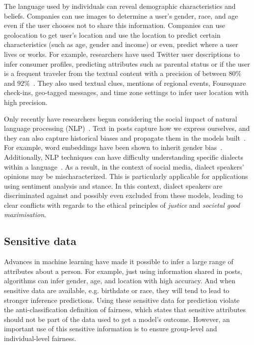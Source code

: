 \documentclass[11pt]{article} %
\begin{document}
The language used by individuals can reveal demographic characteristics and beliefs. Companies can use images to determine a user's  gender, race, and age even if the user chooses not to share this information. Companies can use geolocation to get user's location and use the location to predict certain characteristics (such as age, gender and income) or even, predict where a user lives or works. For example, researchers have used Twitter user descriptions to infer consumer profiles, predicting attributes such as parental status or if the user is a frequent traveler from the textual content with a precision of between $80\%$ and $92\%$~\cite{hernandez2013}. They also used textual clues, mentions of regional events, Foursquare check-ins, geo-tagged messages, and time zone settings to infer user location with high precision. 

Only recently have researchers begun considering the social impact of natural language processing (NLP)~\cite{hovy2016,blodgett2020}. Text in posts capture how we express ourselves, and they can also capture historical biases and propagate them in the models built~\cite{garg2018,caliskan2017}. For example, word embeddings have been shown to inherit gender bias~\cite{sun2019,bolukbasi2016a,gonen2019}. Additionally, NLP techniques can have difficulty understanding specific dialects within a language~\cite{blodgett2016}. As a result, in the context of social media, dialect speakers’ opinions may be mischaracterized. This is particularly applicable for applications using sentiment analysis and stance. In this context, dialect speakers are discriminated against and possibly even excluded from these models, leading to clear conflicts with regards to the ethical principles of \textit{justice} and \textit{societal good maximisation}\cite{mikal2016}.


\subsection{Sensitive data}
Advances in machine learning have made it possible to infer a large range of attributes about a person. For example, just using information shared in posts, algorithms can infer gender, age, and location with high accuracy.  And when sensitive data are available, e.g. birthdate or race, they will tend to lead to stronger inference predictions. Using these sensitive data for prediction violate the anti-classification definition of fairness, which states that sensitive attributes should not be part of the data used to get a model's outcome. However, an important use of this sensitive information is to ensure group-level and individual-level fairness. 
\end{document}
